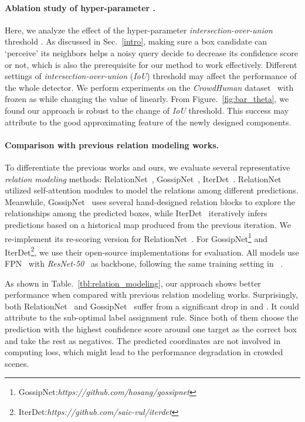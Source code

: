 \documentclass[final]{cvpr}
\begin{document}
\vspace{-0.5cm}
\paragraph{Ablation study of hyper-parameter \textbf{}.}
Here, we analyze the effect of the hyper-parameter \textit{intersection-over-union} threshold . As discussed in Sec.~\ref{intro}, making sure a box candidate can `perceive' its neighbors helps a noisy query decide to decrease its confidence score or not, which is also the prerequisite for our method to work effectively. Different settings of \textit{intersection-over-union} (\emph{IoU}) threshold  may affect the performance of the whole detector. We perform experiments on the \emph{CrowdHuman} dataset~\cite{shao2018crowdhuman} with  frozen as  while changing the value of  linearly. From Figure.~\ref{fig:bar_theta}, we found our approach is robust to the change of \emph{IoU} threshold. This success may attribute to the good approximating feature of the newly designed components.

\vspace{-0.5cm}
\paragraph{Comparison with previous relation modeling works.}
To differentiate the previous works and ours, we evaluate several representative \textit{relation modeling} methods: RelationNet~\cite{hu2018relation}, GossipNet~\cite{gossipnet}, IterDet~\cite{iterdet2021}. RelationNet~\cite{hu2018relation} utilized self-attention modules to model the relations among different predictions. Meanwhile, GossipNet~\cite{gossipnet} uses several hand-designed relation blocks to explore the relationships among the predicted boxes, while IterDet~\cite{iterdet2021} iteratively infers predictions based on a historical map produced from the previous iteration. We re-implement its re-scoring version for RelationNet~\cite{hu2018relation}. For GossipNet\footnote{GossipNet:\textit{https://github.com/hosang/gossipnet}} and IterDet\footnote{IterDet:\textit{https://github.com/saic-vul/iterdet}}, we use their open-source implementations for evaluation. All models use FPN~\cite{lin2017feature} with \emph{ResNet-50}~\cite{he2016deep} as backbone, following the same training setting in ~\cite{gossipnet, hu2018relation,lin2017feature}. 

As shown in Table.~\ref{tbl:relation_modeling}, our approach shows better performance when compared with previous relation modeling works. Surprisingly, both RelationNet~\cite{hu2018relation} and GossipNet~\cite{gossipnet} suffer from a significant drop in  and . It could attribute to the sub-optimal label assignment rule. Since both of them choose the prediction with the highest confidence score around one target as the correct box and take the rest as negatives. The predicted coordinates are not involved in computing loss, which might lead to the performance degradation in crowded scenes.
\end{document}

